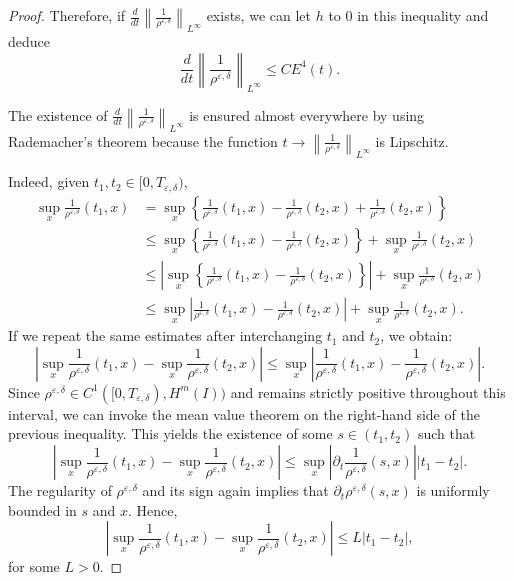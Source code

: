 \documentclass[12pt]{amsart}
\newcommand{\rhoed}{\rho^{\varepsilon,\delta}}
\begin{document}
\begin{proof}
        Therefore, if $\frac{d}{dt} \left\|\frac{1}{\rhoed}\right\|_{L^\infty}$ exists, we can let $h$ to $0$ in this  inequality  and deduce
        \begin{equation*}
            \frac{d}{dt} \left\|\frac{1}{\rhoed}\right\|_{L^\infty} \leq CE^4(t).
        \end{equation*}
        

        The existence of $\frac{d}{dt} \left\|\frac{1}{\rhoed}\right\|_{L^\infty}$ is ensured almost everywhere by using Rademacher's theorem because the function $t\to \left\|\frac{1}{\rhoed}\right\|_{L^\infty}$ is Lipschitz.

        Indeed, given $t_1,t_2\in [0,T_{\varepsilon,\delta})$,
        \begin{equation*}
            \begin{split}
                \sup_{x}\frac{1}{\rhoed}(t_1,x) &=\sup_{x}\left\{\frac{1}{\rhoed}(t_1,x)-\frac{1}{\rhoed}(t_2,x)+\frac{1}{\rhoed}(t_2,x)\right\}\\
                &\leq \sup_{x}\left\{\frac{1}{\rhoed}(t_1,x)-\frac{1}{\rhoed}(t_2,x)\right\}+\sup_{x}\frac{1}{\rhoed}(t_2,x)\\
                &\leq
                \left|\sup_{x}\left\{\frac{1}{\rhoed}(t_1,x)-\frac{1}{\rhoed}(t_2,x)\right\}\right|+\sup_{x}\frac{1}{\rhoed}(t_2,x)\\
                &\leq
                \sup_{x}\left|\frac{1}{\rhoed}(t_1,x)-\frac{1}{\rhoed}(t_2,x)\right|+\sup_{x}\frac{1}{\rhoed}(t_2,x).
            \end{split}
        \end{equation*}
        If we repeat the same estimates after interchanging $t_1$ and $t_2$, we obtain:
        \begin{equation*}
            \left|\sup_{x}\frac{1}{\rhoed}(t_1,x)-\sup_{x}\frac{1}{\rhoed}(t_2,x)\right|\leq \sup_{x}\left|\frac{1}{\rhoed}(t_1,x)-\frac{1}{\rhoed}(t_2,x)\right|.
        \end{equation*}
        Since $\rho^{\varepsilon,\delta} \in C^1([0,T_{\varepsilon,\delta}),H^m(I))$ and remains strictly positive throughout this interval, we can invoke the mean value theorem on the right-hand side of the previous inequality. This yields the existence of some $s \in (t_1, t_2)$ such that
        \begin{equation*}
            \left|\sup_{x}\frac{1}{\rhoed}(t_1,x)-\sup_{x}\frac{1}{\rhoed}(t_2,x)\right|\leq \sup_{x}\left|\partial_t\frac{1}{\rhoed}(s,x)\right||t_1-t_2|.
        \end{equation*}
        The regularity of $\rho^{\varepsilon,\delta}$ and its sign again implies that $\partial_t\rho^{\varepsilon,\delta}(s,x)$ is uniformly bounded in $s$ and $x$. Hence,
        \begin{equation*}
            \left|\sup_{x}\frac{1}{\rhoed}(t_1,x)-\sup_{x}\frac{1}{\rhoed}(t_2,x)\right|\leq L|t_1-t_2|,
        \end{equation*}
        for some $L>0$.


\end{proof}
\end{document}
